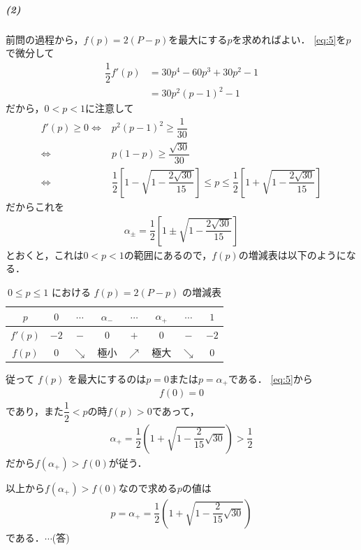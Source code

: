 \documentclass[../../main.tex]{subfiles}
\begin{document}
\subparagraph{(2)}

前問の過程から，$f(p)=2(P-p)$を最大にする$p$を求めればよい．
\cref{eq:5}を$p$で微分して
\begin{align}
  \dfrac{1}{2}f'(p)
  &=30p^4-60p^3+30p^2-1 \\
  &=30p^2(p-1)^2-1
\end{align}
だから，$0<p<1$に注意して
\begin{align}
  f'(p)\ge0
  \Longleftrightarrow
  &p^2(p-1)^2\ge\dfrac{1}{30} \\
  \Longleftrightarrow
  &p(1-p)\ge\dfrac{\sqrt{30}}{30} \\
  \Longleftrightarrow
  &\dfrac{1}{2}\left[1-\sqrt{1-\dfrac{2\sqrt{30}}{15}}\right]
  \le p
  \le
  \dfrac{1}{2}\left[1+\sqrt{1-\dfrac{2\sqrt{30}}{15}}\right]
\end{align}
だからこれを
\begin{align}
  \alpha_{\pm} = \dfrac{1}{2}\left[1\pm\sqrt{1-\dfrac{2\sqrt{30}}{15}}\right]
\end{align}
とおくと，これは$0<p<1$の範囲にあるので，$f(p)$の増減表は以下のようになる．

\begin{table}[htb]
  \centering
  \caption{$0\le p\le 1$ における $f(p)=2(P-p)$ の増減表}
  \label{tab:1974_6_fp_variation}
  \renewcommand{\arraystretch}{1.35}
  \begin{tabular}{|c|c|c|c|c|c|c|c|}
    \hline
    $p$ & $0$ & $\cdots$ & $\alpha_{-}$ & $\cdots$ & $\alpha_{+}$ & $\cdots$ & $1$ \\
    \hline
    $f'(p)$ & $-2$ & $-$ & $0$ & $+$ & $0$ & $-$ & $-2$ \\
    \hline
    $f(p)$ & $0$ & $\searrow$ & 極小 & $\nearrow$ & 極大 & $\searrow$ & $0$ \\
    \hline
  \end{tabular}
\end{table}

従って $f(p)$ を最大にするのは$p=0$または$p=\alpha_{+}$である．
\cref{eq:5}から
\begin{align}
  f(0)=0
\end{align}
であり，また$\dfrac{1}{2}<p$の時$f(p)>0$であって，
\begin{align}
  \alpha_{+} = \dfrac{1}{2}\left(1+\sqrt{1-\dfrac{2}{15}\sqrt{30}}\right)>\dfrac{1}{2}
\end{align}
だから$f(\alpha_{+})>f(0)$が従う．

以上から$f(\alpha_{+})>f(0)$なので求める$p$の値は
\begin{align}
  p=\alpha_{+}=\dfrac{1}{2}\left(1+\sqrt{1-\dfrac{2}{15}\sqrt{30}}\right)
\end{align}
である．$\cdots$(答)
\end{document}
